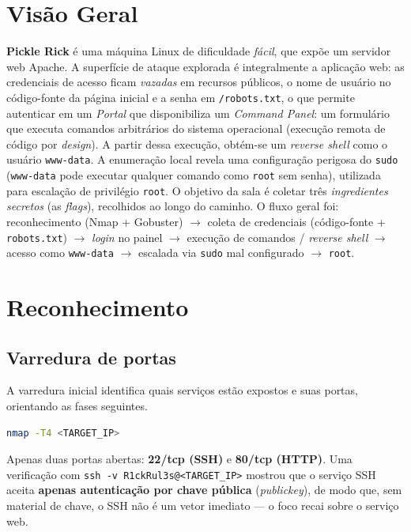 \documentclass[12pt,a4paper]{article}
\newcommand{\cmd}[1]{\lstinline[style=shell]|#1|}
\begin{document}
\section{Visão Geral}
\textbf{Pickle Rick} é uma máquina Linux de dificuldade \emph{fácil}, 
que expõe um servidor web Apache. A superfície
de ataque explorada é integralmente a aplicação web: as credenciais de acesso
ficam \emph{vazadas} em recursos públicos, o nome de usuário no código-fonte
da página inicial e a senha em \texttt{/robots.txt}, o que permite
autenticar em um \emph{Portal} que disponibiliza um \emph{Command Panel}: um
formulário que executa comandos arbitrários do sistema operacional (execução
remota de código por \emph{design}). A partir dessa execução, obtém-se um
\emph{reverse shell} como o usuário \texttt{www-data}. A enumeração local revela
uma configuração perigosa do \texttt{sudo} (\texttt{www-data} pode executar
qualquer comando como \texttt{root} sem senha), utilizada para escalação de privilégio \texttt{root}.
O objetivo da sala é coletar três \emph{ingredientes secretos} (as \emph{flags}),
recolhidos ao longo do caminho. O fluxo geral foi: reconhecimento
(Nmap + Gobuster) $\rightarrow$ coleta de credenciais (código-fonte +
\texttt{robots.txt}) $\rightarrow$ \emph{login} no painel $\rightarrow$ execução
de comandos / \emph{reverse shell} $\rightarrow$ acesso como \texttt{www-data}
$\rightarrow$ escalada via \texttt{sudo} mal configurado $\rightarrow$
\texttt{root}.

\section{Reconhecimento}

\subsection{Varredura de portas}
A varredura inicial identifica quais serviços estão expostos e suas portas,
orientando as fases seguintes.

\begin{lstlisting}[language=bash,caption={Varredura de portas e serviços com Nmap.}]
nmap -T4 <TARGET_IP>
\end{lstlisting}

Apenas duas portas abertas: \textbf{22/tcp (SSH)} e \textbf{80/tcp (HTTP)}.
Uma verificação com \cmd{ssh -v R1ckRul3s@<TARGET_IP>} mostrou que o serviço
SSH aceita \textbf{apenas autenticação por chave pública} (\emph{publickey}),
de modo que, sem material de chave, o SSH não é um vetor imediato --- o foco
recai sobre o serviço web.
\end{document}

